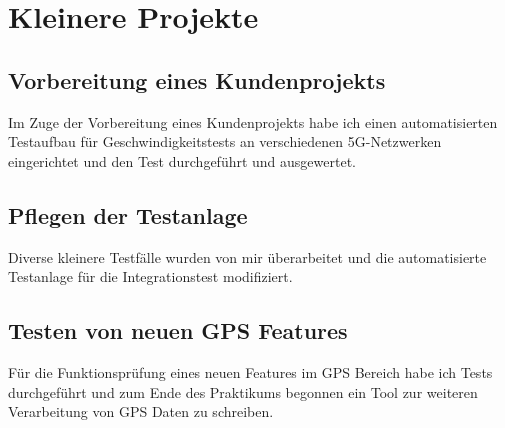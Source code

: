 \section{Kleinere Projekte}
\subsection{Vorbereitung eines Kundenprojekts}
Im Zuge der Vorbereitung eines Kundenprojekts habe ich einen automatisierten Testaufbau für Geschwindigkeitstests an verschiedenen 5G-Netzwerken eingerichtet und den Test durchgeführt und ausgewertet.
\subsection{Pflegen der Testanlage}
Diverse kleinere Testfälle wurden von mir überarbeitet und die automatisierte Testanlage für die Integrationstest modifiziert.
\subsection{Testen von neuen GPS Features}
Für die Funktionsprüfung eines neuen Features im GPS Bereich habe ich Tests durchgeführt und zum Ende des Praktikums begonnen ein Tool zur weiteren Verarbeitung von GPS Daten zu schreiben.
